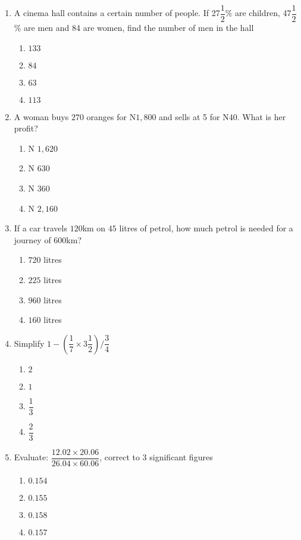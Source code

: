 \begin{multicols}{2}
\begin{enumerate}[label={\arabic*.}]
\item A cinema hall contains a certain number of people. If 27\(\dfrac{1}{2}\)\% are children, 47\(\dfrac{1}{2}\)\% are men and 84 are 
women, find the number of men in the hall
    \begin{enumerate}[label={\Alph*.}]
    \item \(133\)
    \item \(84\)
    \item \(63\)
    \item \(113\)
    \end{enumerate}
\item A woman buys \(270\) oranges for N\(1,800\) and sells at 5 for N\(40\). What is her profit?
    \begin{enumerate}[label={\Alph*.}]
    \item N \(1,620\)
    \item N \(630\)
    \item N \(360\)
    \item N \(2,160\)
    \end{enumerate}
\item If a car travels \(120\)km on \(45\) litres of petrol, how much petrol is needed for a journey of \(600\)km?
    \begin{enumerate}[label={\Alph*.}]
    \item \(720\) litres
    \item \(225\) litres
    \item \(960\) litres
    \item \(160\) litres
    \end{enumerate}
\item Simplify \(1 - \left(\dfrac{1}{7} \times 3\dfrac{1}{2}\right) / \dfrac{3}{4}\)
    \begin{enumerate}[label={\Alph*.}]
    \item \(2\)
    \item \(1\)
    \item \(\dfrac{1}{3}\)
    \item \(\dfrac{2}{3}\)
    \end{enumerate}
\item Evaluate: \(\dfrac{12.02 \times 20.06}{26.04 \times 60.06}\), correct to 3 significant figures
    \begin{enumerate}[label={\Alph*.}]
    \item \(0.154\)
    \item \(0.155\)
    \item \(0.158\)
    \item \(0.157\)

\end{enumerate}
\end{enumerate}
\end{multicols}
